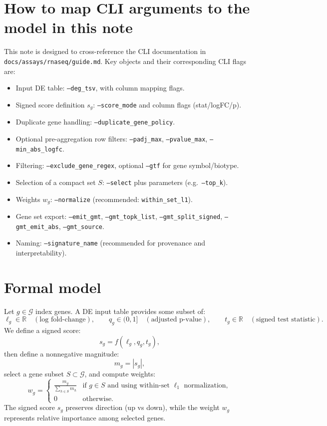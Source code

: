 \documentclass[11pt]{article}
\begin{document}
\section{How to map CLI arguments to the model in this note}
This note is designed to cross-reference the CLI documentation in \texttt{docs/assays/rnaseq/guide.md}.
Key objects and their corresponding CLI flags are:
\begin{itemize}[leftmargin=2em]
\item Input DE table: \texttt{--deg\_tsv}, with column mapping flags.
\item Signed score definition $s_g$: \texttt{--score\_mode} and column flags (stat/logFC/p).
\item Duplicate gene handling: \texttt{--duplicate\_gene\_policy}.
\item Optional pre-aggregation row filters: \texttt{--padj\_max}, \texttt{--pvalue\_max}, \texttt{--min\_abs\_logfc}.
\item Filtering: \texttt{--exclude\_gene\_regex}, optional \texttt{--gtf} for gene symbol/biotype.
\item Selection of a compact set $S$: \texttt{--select} plus parameters (e.g.\ \texttt{--top\_k}).
\item Weights $w_g$: \texttt{--normalize} (recommended: \texttt{within\_set\_l1}).
\item Gene set export: \texttt{--emit\_gmt}, \texttt{--gmt\_topk\_list}, \texttt{--gmt\_split\_signed}, \texttt{--gmt\_emit\_abs}, \texttt{--gmt\_source}.
\item Naming: \texttt{--signature\_name} (recommended for provenance and interpretability).
\end{itemize}

\section{Formal model}
Let $g \in \mathcal{G}$ index genes. A DE input table provides some subset of:
\[
\ell_g \in \mathbb{R} \quad (\text{log fold-change}), \qquad
q_g \in (0,1] \quad (\text{adjusted p-value}), \qquad
t_g \in \mathbb{R} \quad (\text{signed test statistic}).
\]
We define a signed score:
\begin{equation}
s_g = f(\ell_g, q_g, t_g),
\label{eq:signed_score}
\end{equation}
then define a nonnegative magnitude:
\begin{equation}
m_g = |s_g|,
\label{eq:magnitude}
\end{equation}
select a gene subset $S \subset \mathcal{G}$, and compute weights:
\begin{equation}
w_g =
\begin{cases}
\displaystyle \frac{m_g}{\sum_{h \in S} m_h} & \text{if } g \in S \text{ and using within-set } \ell_1 \text{ normalization}, \\
0 & \text{otherwise.}
\end{cases}
\label{eq:within_set_l1}
\end{equation}
The signed score $s_g$ preserves direction (up vs down), while the weight $w_g$ represents relative importance among selected genes.
\end{document}

